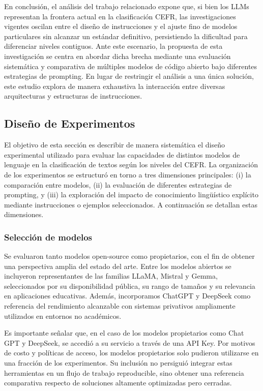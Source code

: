 En conclusión, el análisis del trabajo relacionado expone que, si bien los LLMs representan la frontera actual en la clasificación CEFR, las investigaciones vigentes oscilan entre el diseño de instrucciones y el ajuste fino de modelos particulares sin alcanzar un estándar definitivo, persistiendo la dificultad para diferenciar niveles contiguos. Ante este escenario, la propuesta de esta investigación se centra en abordar dicha brecha mediante una evaluación sistemática y comparativa de múltiples modelos de código abierto bajo diferentes estrategias de prompting. En lugar de restringir el análisis a una única solución, este estudio explora de manera exhaustiva la interacción entre diversas arquitecturas y estructuras de instrucciones.

\subsection{Diseño de Experimentos}\label{subsection:clas_diseño}
El objetivo de esta sección es describir de manera sistemática el diseño experimental utilizado para evaluar las capacidades de distintos modelos de lenguaje en la clasificación de textos según los niveles del CEFR. La organización de los experimentos se estructuró en torno a tres dimensiones principales: (i) la comparación entre modelos, (ii) la evaluación de diferentes estrategias de prompting, y (iii) la exploración del impacto de conocimiento lingüístico explícito mediante instrucciones o ejemplos seleccionados. A continuación se detallan estas dimensiones.

\subsubsection*{Selección de modelos}
Se evaluaron tanto modelos open-source como propietarios, con el fin de obtener una perspectiva amplia del estado del arte. Entre los modelos abiertos se incluyeron representantes de las familias LLaMA, Mistral y Gemma, seleccionados por su disponibilidad pública, su rango de tamaños y su relevancia en aplicaciones educativas. Además, incorporamos ChatGPT y DeepSeek como referencia del rendimiento alcanzable con sistemas privativos ampliamente utilizados en entornos no académicos.

Es importante señalar que, en el caso de los modelos propietarios como Chat GPT y DeepSeek, se accedió a su servicio a través de una API Key.
Por motivos de costo y políticas de acceso, los modelos propietarios solo pudieron utilizarse en una fracción de los experimentos. Su inclusión no persiguió integrar estas herramientas en un flujo de trabajo reproducible, sino obtener una referencia comparativa respecto de soluciones altamente optimizadas pero cerradas.

